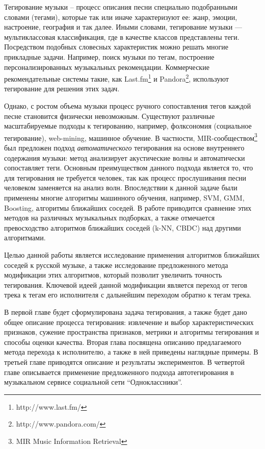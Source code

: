 \startprefacepage	

Тегирование музыки -- процесс описания песни специально подобранными словами (тегами), которые так или иначе характеризуют ее: жанр, эмоции, настроение, география и так далее.
Иными словами, тегирование музыки {{---}} мультиклассовая классификация, где в качестве классов представлены теги.
Посредством подобных словесных характеристик можно решать многие прикладные задачи. Например, поиск музыки по тегам, построение персонализированных музыкальных рекомендации.
Коммерческие рекомендательные системы такие, как Last.fm\footnote{http://www.last.fm/} и Pandora\footnote{http://www.pandora.com/}, используют тегирование для решения этих задач. 

Однако, с ростом объема музыки процесс ручного сопоставления 
тегов каждой песне становится физически невозможным. Существуют различные масштабируемые подходы к тегированию, например, фолксономия (социальное тегирование), web-mining, машинное обучение. 
В частности, MIR-сообществом\footnote{MIR \ld Music Information Retrieval} был предложен подход \emph{автоматического} тегирования на основе внутреннего содержания музыки: 
метод анализирует акустические волны и автоматически сопоставляет теги. 
Основным преимуществом данного подхода является то, что для тегирования не требуется человек, так как процесс прослушивания песни человеком заменяется на анализ волн.
Впоследствии к данной задаче были применены многие алгоритмы машинного обучения, например, SVM, GMM, Boosting, алгоритмы ближайших соседей. 
В работе \cite{msordo_thesis} приводится сравнение этих методов на различных музыкальных подборках, а также отмечается превосходство алгоритмов ближайших соседей (k-NN, CBDC) над другими алгоритмами.

Целью данной работы является исследование применения алгоритмов ближайших соседей к русской музыке, а также исследование предложенного метода модификации этих алгоритмов, который
позволит увеличить точность тегирования.
Ключевой идеей данной модификации является переход от тегов трека к тегам его исполнителя с дальнейшим переходом обратно к тегам трека.

В первой главе будет сформулирована задача тегирования, а также будет дано общее описание процесса тегирования: извлечение и выбор характеристических признаков,
сужение пространства признаков, метрики и алгоритмы тегирования и способы оценки качества.
Вторая глава посвящена описанию предлагаемого метода перехода к исполнителю, а также в ней приведены наглядные примеры.
В третьей главе приводятся описание и результаты экспериментов. В четвертой главе описывается применение предложенного подхода автотегирования в музыкальном сервисе
социальной сети ``Одноклассники''.